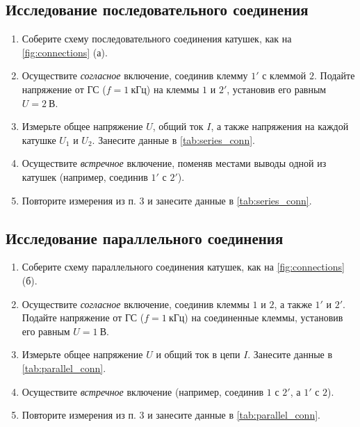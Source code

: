 \subsection{Исследование последовательного соединения}
\begin{enumerate}
    \item Соберите схему последовательного соединения катушек, как на \cref{fig:connections} (а).
    \item Осуществите \textit{согласное} включение, соединив клемму $1'$ с клеммой $2$. Подайте напряжение от ГС ($f = 1~\text{кГц}$) на клеммы $1$ и $2'$, установив его равным $U = 2~\text{В}$.
    \item Измерьте общее напряжение $U$, общий ток $I$, а также напряжения на каждой катушке $U_1$ и $U_2$. Занесите данные в \cref{tab:series_conn}.
    \item Осуществите \textit{встречное} включение, поменяв местами выводы одной из катушек (например, соединив $1'$ с $2'$).
    \item Повторите измерения из п. 3 и занесите данные в \cref{tab:series_conn}.
\end{enumerate}

\subsection{Исследование параллельного соединения}
\begin{enumerate}
    \item Соберите схему параллельного соединения катушек, как на \cref{fig:connections} (б).
    \item Осуществите \textit{согласное} включение, соединив клеммы $1$ и $2$, а также $1'$ и $2'$. Подайте напряжение от ГС ($f = 1~\text{кГц}$) на соединенные клеммы, установив его равным $U = 1~\text{В}$.
    \item Измерьте общее напряжение $U$ и общий ток в цепи $I$. Занесите данные в \cref{tab:parallel_conn}.
    \item Осуществите \textit{встречное} включение (например, соединив $1$ с $2'$, а $1'$ с $2$).
    \item Повторите измерения из п. 3 и занесите данные в \cref{tab:parallel_conn}.
\end{enumerate}

